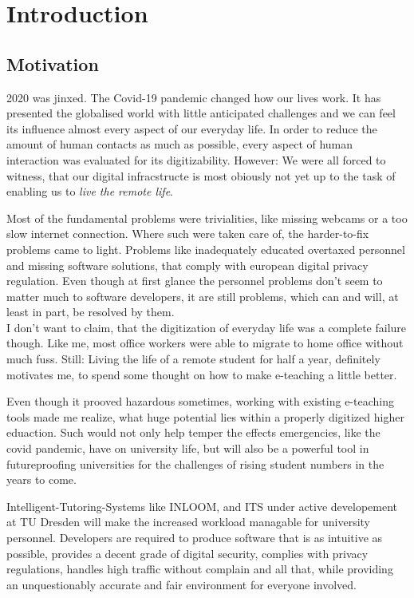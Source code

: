 \chapter{Introduction}
\label{ch:introduction}


\section[Motivation]{Motivation}

2020 was jinxed. The Covid-19 pandemic changed how our lives work.
It has presented the globalised world with little anticipated challenges
and we can feel its influence almost every aspect of our everyday life. 
In order to reduce the amount of human contacts as much as possible, every 
aspect of human interaction was evaluated for its digitizability. However: 
We were all forced to witness, that our digital infracstructe is most obiously 
not yet up to the task of enabling us to \textit{live the remote life}.

Most of the fundamental problems were trivialities, like missing webcams or 
a too slow internet connection. Where such were taken care of, the harder-to-fix
problems came to light. Problems like inadequately educated overtaxed personnel 
and missing software solutions, that comply with european digital privacy regulation. 
Even though at first glance the personnel problems don't seem to matter much to 
software developers, it are still problems, which can and will, at least in part,
be resolved by them. \\

I don't want to claim, that the digitization of everyday life was a complete
failure though. Like me, most office workers were able to migrate to home office 
without much fuss. Still: Living the life of a remote student for half a year,
definitely motivates me, to spend some thought on how to make e-teaching a 
little better. 

Even though it prooved hazardous sometimes, working with existing e-teaching 
tools made me realize, what huge potential lies within a properly digitized higher
eduaction. Such would not only help temper the effects emergencies, like the covid
pandemic, have on university life, but will also be a powerful tool in futureproofing
universities for the challenges of rising student numbers in the years to come.

Intelligent-Tutoring-Systems like INLOOM, and ITS under active developement at TU 
Dresden will make the increased workload managable for university personnel. 
Developers are required to produce software that is as intuitive as possible, provides
a decent grade of digital security, complies with privacy regulations, handles high 
traffic without complain and all that, while providing an unquestionably accurate and 
fair environment for everyone involved. 

